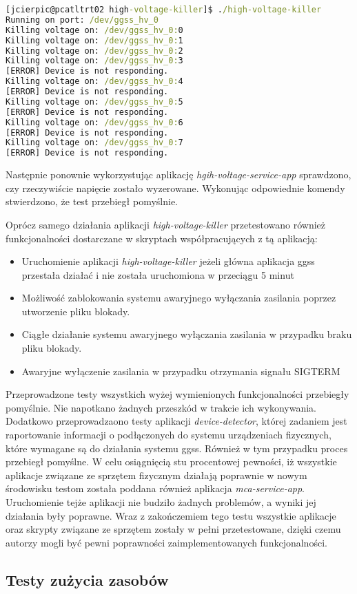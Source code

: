 \begin{lstlisting}[language=cmd,caption={Uruchomienie aplikacji \emph{high-voltage-killer}},label={lst:high-voltage-killer},frame=single]
[jcierpic@pcatltrt02 high-voltage-killer]$ ./high-voltage-killer
Running on port: /dev/ggss_hv_0
Killing voltage on: /dev/ggss_hv_0:0
Killing voltage on: /dev/ggss_hv_0:1
Killing voltage on: /dev/ggss_hv_0:2
Killing voltage on: /dev/ggss_hv_0:3
[ERROR] Device is not responding.
Killing voltage on: /dev/ggss_hv_0:4
[ERROR] Device is not responding.
Killing voltage on: /dev/ggss_hv_0:5
[ERROR] Device is not responding.
Killing voltage on: /dev/ggss_hv_0:6
[ERROR] Device is not responding.
Killing voltage on: /dev/ggss_hv_0:7
[ERROR] Device is not responding.
\end{lstlisting}

Następnie ponownie wykorzystując aplikację \emph{hgih-voltage-service-app} sprawdzono, czy rzeczywiście napięcie zostało wyzerowane. Wykonując odpowiednie komendy stwierdzono, że test przebiegł pomyślnie.

Oprócz samego działania aplikacji \emph{high-voltage-killer} przetestowano również funkcjonalności dostarczane w skryptach współpracujących z tą aplikacją:
\begin{itemize}
    \item Uruchomienie aplikacji \emph{high-voltage-killer} jeżeli główna aplikacja ggss przestała działać i nie została uruchomiona w przeciągu 5 minut
    \item Możliwość zablokowania systemu awaryjnego wyłączania zasilania poprzez utworzenie pliku blokady.
    \item Ciągłe działanie systemu awaryjnego wyłączania zasilania w przypadku braku pliku blokady.
    \item Awaryjne wyłączenie zasilania w przypadku otrzymania signału SIGTERM
\end{itemize}

Przeprowadzone testy wszystkich wyżej wymienionych funkcjonalności przebiegły pomyślnie. Nie napotkano żadnych przeszkód w trakcie ich wykonywania.
Dodatkowo przeprowadzaono testy aplikacji \emph{device-detector}, której zadaniem jest raportowanie informacji o podłączonych do systemu urządzeniach fizycznych, które wymagane są do działania systemu ggss. Również w tym przypadku proces przebiegł pomyślne. W celu osiągnięcią stu procentowej pewności, iż wszystkie aplikacje związane ze sprzętem fizycznym działają poprawnie w nowym środowisku testom została poddana również aplikacja \emph{mca-service-app}. Uruchomienie tejże aplikacji nie budziło żadnych problemów, a wyniki jej działania były poprawne. Wraz z zakończemiem tego testu wszystkie aplikacje oraz skrypty związane ze sprzętem zostały w pełni przetestowane, dzięki czemu autorzy mogli być pewni poprawności zaimplementowanych funkcjonalności.


\subsection{Testy zużycia zasobów}
